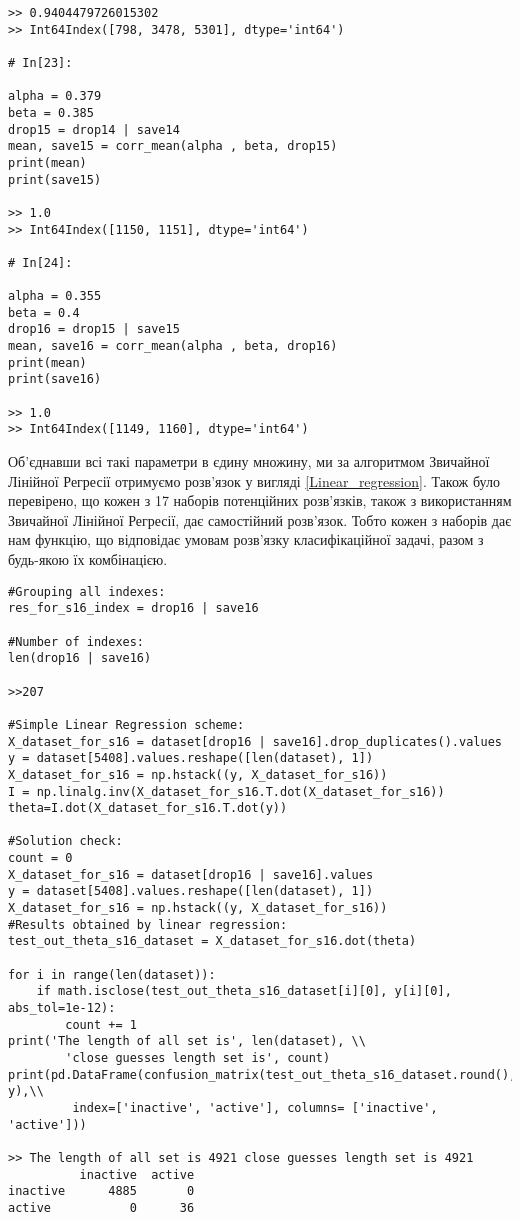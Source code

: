 \documentclass[12pt,a4paper]{article}
\theoremstyle{myplain}
\numberwithin{equation}{section}
\begin{document}
\begin{lstlisting}
>> 0.9404479726015302
>> Int64Index([798, 3478, 5301], dtype='int64')

# In[23]:

alpha = 0.379
beta = 0.385
drop15 = drop14 | save14
mean, save15 = corr_mean(alpha , beta, drop15)
print(mean)
print(save15)

>> 1.0
>> Int64Index([1150, 1151], dtype='int64')

# In[24]:

alpha = 0.355
beta = 0.4
drop16 = drop15 | save15
mean, save16 = corr_mean(alpha , beta, drop16)
print(mean)
print(save16)

>> 1.0
>> Int64Index([1149, 1160], dtype='int64')

\end{lstlisting}



Об'єднавши всі такі параметри в єдину множину, ми за алгоритмом Звичайної Лінійної Регресії отримуємо розв'язок у вигляді \eqref{Linear_regression}. Також було перевірено, що кожен з 17 наборів потенційних розв'язків, також з використанням Звичайної Лінійної Регресії, дає самостійний розв'язок. Тобто кожен з наборів дає нам функцію, що відповідає умовам розв'язку класифікаційної задачі, разом з будь-якою їх комбінацією.

\begin{lstlisting}
#Grouping all indexes:
res_for_s16_index = drop16 | save16

#Number of indexes:
len(drop16 | save16)

>>207

#Simple Linear Regression scheme:
X_dataset_for_s16 = dataset[drop16 | save16].drop_duplicates().values
y = dataset[5408].values.reshape([len(dataset), 1])
X_dataset_for_s16 = np.hstack((y, X_dataset_for_s16))
I = np.linalg.inv(X_dataset_for_s16.T.dot(X_dataset_for_s16))
theta=I.dot(X_dataset_for_s16.T.dot(y))

#Solution check:
count = 0
X_dataset_for_s16 = dataset[drop16 | save16].values
y = dataset[5408].values.reshape([len(dataset), 1])
X_dataset_for_s16 = np.hstack((y, X_dataset_for_s16))
#Results obtained by linear regression:
test_out_theta_s16_dataset = X_dataset_for_s16.dot(theta)

for i in range(len(dataset)):
    if math.isclose(test_out_theta_s16_dataset[i][0], y[i][0], abs_tol=1e-12):
        count += 1
print('The length of all set is', len(dataset), \\
		'close guesses length set is', count)
print(pd.DataFrame(confusion_matrix(test_out_theta_s16_dataset.round(), y),\\
		 index=['inactive', 'active'], columns= ['inactive', 'active']))

>> The length of all set is 4921 close guesses length set is 4921
          inactive  active
inactive      4885       0
active           0      36
\end{lstlisting}
\end{document}
